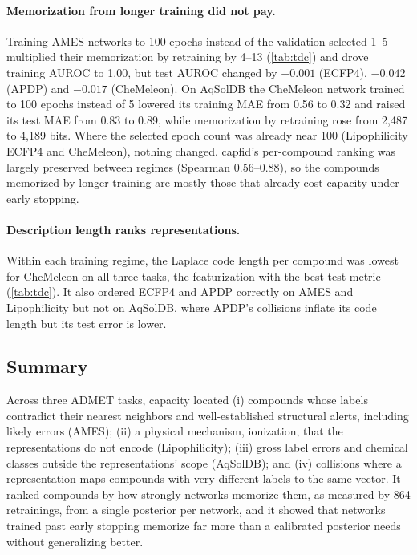\documentclass[10pt,twocolumn,letterpaper]{article}
\theoremstyle{definition}
\begin{document}
\paragraph{Memorization from longer training did not pay.} Training AMES networks to 100 epochs instead of the validation-selected 1--5 multiplied their memorization by retraining by 4--13 (\cref{tab:tdc}) and drove training AUROC to 1.00, but test AUROC changed by $-0.001$ (ECFP4), $-0.042$ (APDP) and $-0.017$ (CheMeleon). On AqSolDB the CheMeleon network trained to 100 epochs instead of 5 lowered its training MAE from 0.56 to 0.32 and raised its test MAE from 0.83 to 0.89, while memorization by retraining rose from 2{,}487 to 4{,}189 bits. Where the selected epoch count was already near 100 (Lipophilicity ECFP4 and CheMeleon), nothing changed. capfid's per-compound ranking was largely preserved between regimes (Spearman 0.56--0.88), so the compounds memorized by longer training are mostly those that already cost capacity under early stopping.

\paragraph{Description length ranks representations.} Within each training regime, the Laplace code length per compound was lowest for CheMeleon on all three tasks, the featurization with the best test metric (\cref{tab:tdc}). It also ordered ECFP4 and APDP correctly on AMES and Lipophilicity but not on AqSolDB, where APDP's collisions inflate its code length but its test error is lower.

\subsection{Summary}
Across three ADMET tasks, capacity located (i) compounds whose labels contradict their nearest neighbors and well-established structural alerts, including likely errors (AMES); (ii) a physical mechanism, ionization, that the representations do not encode (Lipophilicity); (iii) gross label errors and chemical classes outside the representations' scope (AqSolDB); and (iv) collisions where a representation maps compounds with very different labels to the same vector. It ranked compounds by how strongly networks memorize them, as measured by 864 retrainings, from a single posterior per network, and it showed that networks trained past early stopping memorize far more than a calibrated posterior needs without generalizing better.
\end{document}
